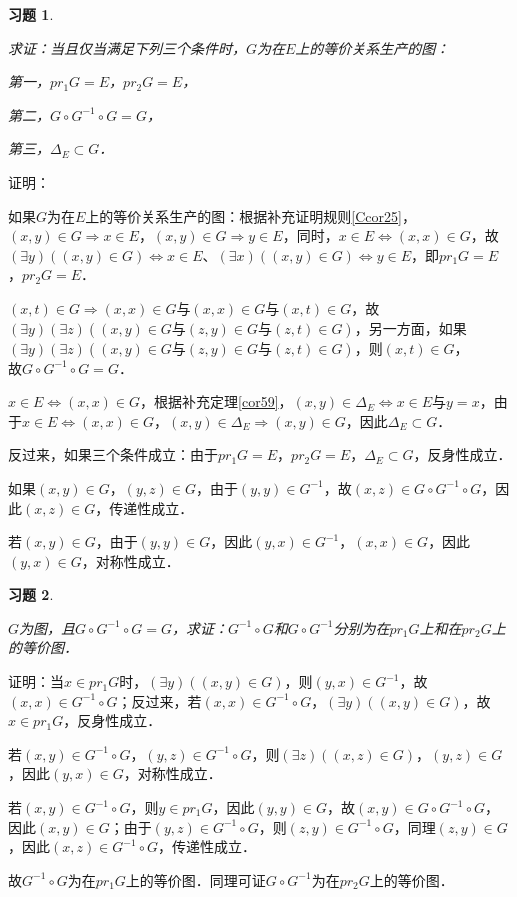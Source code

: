 \documentclass[12pt, a4paper, oneside]{book}
\newtheorem{exer}{习题}
\begin{document}
			\begin{exer}\label{exer67}
				\hfill\par
				求证：当且仅当满足下列三个条件时，$G$为在$E$上的等价关系生产的图：
				\par
				第一，$pr_1G=E$，$pr_2G=E$，
				\par
				第二，$G\circ G^{-1}\circ G=G$，
				\par
				第三，$\Delta_E\subset G$．
			\end{exer}
			证明：
			\par
			如果$G$为在$E$上的等价关系生产的图：根据补充证明规则\ref{Ccor25}，$(x, y)\in G\Rightarrow x\in E$，$(x, y)\in G\Rightarrow y\in E$，同时，$x\in E\Leftrightarrow (x, x)\in G$，故$(\exists y)((x, y)\in G)\Leftrightarrow x\in E$、$(\exists x)((x, y)\in G)\Leftrightarrow y\in E$，即$pr_1G=E$，$pr_2G=E$．
			\par
			$(x, t)\in G\Rightarrow (x, x)\in G\text{与}(x, x)\in G\text{与}(x, t)\in G$，故$(\exists y)(\exists z)((x, y)\in G\text{与}(z, y)\in G\text{与}(z, t)\in G)$，另一方面，如果$(\exists y)(\exists z)((x, y)\in G\text{与}(z, y)\in G\text{与}(z, t)\in G)$，则$(x, t)\in G$，$故G\circ G^{-1}\circ G=G$．
			\par
			$x\in E\Leftrightarrow (x, x)\in G$，根据补充定理\ref{cor59}，$(x, y)\in \Delta_E\Leftrightarrow x\in E\text{与}y=x$，由于$x\in E\Leftrightarrow (x, x)\in G$，$(x, y)\in \Delta_E\Rightarrow (x, y)\in G$，因此$\Delta_E\subset G$．
			\par
			反过来，如果三个条件成立：由于$pr_1G=E$，$pr_2G=E$，$\Delta_E\subset G$，反身性成立．
			\par
			如果$(x, y)\in G$，$(y, z) \in G$，由于$(y, y) \in G^{-1}$，故$(x, z)\in G\circ G^{-1}\circ G$，因此$(x, z)\in G$，传递性成立．
			\par
			若$(x, y)\in G$，由于$(y, y)\in G$，因此$(y, x)\in G^{-1}$，$(x, x)\in G$，因此$(y, x)\in G$，对称性成立．
			
			\begin{exer}\label{exer68}
				\hfill\par
				$G$为图，且$G\circ G^{-1}\circ G=G$，求证：$G^{-1}\circ G$和$G\circ G^{-1}$分别为在$pr_1G$上和在$pr_2G$上的等价图．
			\end{exer}
			证明：当$x\in pr_1G$时，$(\exists y)((x, y)\in G)$，则$(y, x)\in G^{-1}$，故$(x, x)\in G^{-1}\circ G$；反过来，若$(x, x)\in G^{-1}\circ G$，$(\exists y)((x, y)\in G)$，故$x\in pr_1G$，反身性成立．
			\par
			若$(x, y)\in G^{-1}\circ G$，$(y, z)\in G^{-1}\circ G$，则$(\exists z)((x, z)\in G)$，$(y, z)\in G$，因此$(y, x)\in G$，对称性成立．
			\par
			若$(x, y)\in G^{-1}\circ G$，则$y\in pr_1G$，因此$(y, y)\in G$，故$(x, y)\in G\circ G^{-1}\circ G$，因此$(x, y)\in G$；由于$(y, z)\in G^{-1}\circ G$，则$(z, y) \in G^{-1}\circ G$，同理$(z, y)\in G$，因此$(x, z) \in G^{-1}\circ G$，传递性成立．
			\par
			故$G^{-1}\circ G$为在$pr_1G$上的等价图．同理可证$G\circ G^{-1}$为在$pr_2G$上的等价图．
\end{document}
